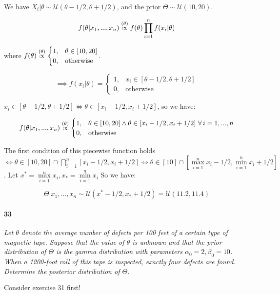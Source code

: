 \documentclass[a4paper]{article}
\begin{document}
                We have $X_i | \theta \sim \mathcal{U}(\theta - 1/2, \theta +
                1/2)$, and the prior $\Theta \sim \mathcal{U}(10, 20)$.

                \[
                    f(\theta | x_1, ..., x_n) \stackrel{({\theta})}{\propto} f(\theta)
                    \prod_{i=1}^n f(x_i | \theta)
                \]

                where $f(\theta) \stackrel{({\theta})}{\propto} \begin{cases}1, & \theta \in
                [10, 20] \\ 0, &\text{otherwise}\end{cases}$.

                \[
                    \implies f(x_i | \theta) = \begin{cases}1, & x_i \in [\theta
                    - 1/2, \theta + 1/2] \\ 0, & \text{otherwise}\end{cases}
                \]

                $x_i \in [\theta - 1/2, \theta + 1/2] \iff \theta \in [x_i -
                1/2, x_i + 1/2]$, so we have:

                \[
                    f(\theta | x_1, ..., x_n) \stackrel{({\theta})}{\propto} \begin{cases}1, &
                    \theta \in [10, 20] \land \theta \in [x_i - 1/2, x_i + 1/2]
                    \,\,\forall\, i = 1, ..., n \\ 0, & \text{otherwise}\end{cases}
                \]

                The first condition of this piecewise function holds $\iff
                \theta \in [10, 20] \cap \bigcap\limits_{i=1}^n [x_i - 1/2, x_i
                + 1/2] \iff \theta \in [10] \cap [\max\limits_{i=1}^n x_i - 1/2,
                \min\limits_{i=1}^n x_i + 1/2]$. Let $x^* = \max\limits_{i=1}^n
                x_i, x_* = \min\limits_{i = 1}^n x_i$ So we have:

                \[
                    \Theta | x_1, ..., x_n \sim \mathcal{U}(x^* - 1/2, x_* +
                    1/2) = \mathcal{U}(11.2, 11.4)
                \]

            \paragraph{33}
            \textit{Let $\theta$ denote the average number of defects per 100
            feet of a certain type of magnetic tape. Suppose that the value of
            $\theta$ is unknown and that the prior distribution of $\Theta$ is
            the gamma distribution with parameters $\alpha_0 = 2, \beta_0 = 10$.
            When a 1200-foot roll of this tape is inspected, exactly four
            defects are found. Determine the posterior distribution of
            $\Theta$.}
                \begin{relq}
                    Consider exercise 31 first!
                \end{relq}
\end{document}
